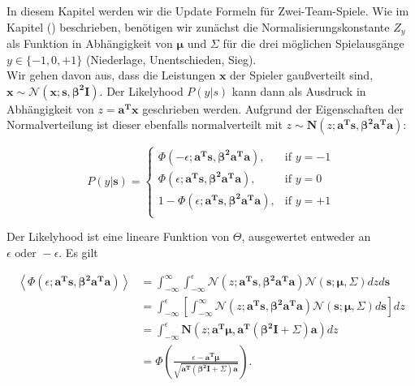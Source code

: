 \documentclass[12pt,a4paper]{scrartcl}
\numberwithin{equation}{section}
\begin{document}
In diesem Kapitel werden wir die Update Formeln für Zwei-Team-Spiele. Wie im Kapitel () beschrieben, benötigen wir
zunächst die Normalisierungskonstante $Z_y$ als Funktion in Abhängigkeit von $\mathbf{\mu} \text{ und } \mathbf{\varSigma}$ für 
die drei möglichen Spielausgänge $y \in \{ -1,0, +1 \}$ (Niederlage, Unentschieden, Sieg). \\
Wir gehen davon aus, dass die Leistungen $\mathbf{x}$ der Spieler gaußverteilt sind, $\mathbf{x} \sim \mathcal{N}(\mathbf{x;s, \beta^2 I})$.
Der Likelyhood $P(y|s)$ kann dann als Ausdruck in Abhängigkeit von $z = \mathbf{a^T x}$ geschrieben werden. Aufgrund der Eigenschaften 
der Normalverteilung ist dieser ebenfalls normalverteilt mit $z \sim \mathbf{N}(z;\mathbf{a^T s, \beta^2 a^T a})$: 

\begin{equation}
 P(y|\mathbf{s}) = \begin{cases}
                     \Phi(- \epsilon; \mathbf{a^Ts, \beta^2 a^T a}), & \mbox{if } y = -1 \\
                     \Phi(\epsilon; \mathbf{a^Ts, \beta^2 a^T a}), & \mbox{if } y = 0 \\
                     1- \Phi(\epsilon; \mathbf{a^Ts, \beta^2 a^T a}), & \mbox{if } y = +1 \\
                   \end{cases}
\end{equation}

Der Likelyhood ist eine lineare Funktion von $\Theta$, ausgewertet entweder an $\epsilon \text{ oder } - \epsilon$. Es gilt

\begin{equation}
\begin{split}
 \left < \Phi \left ( \epsilon; \mathbf{a^T s, \beta^2 a^T a} \right )\right > &= \int_{- \infty}^{\infty} \int_{-\infty}^{\epsilon} \mathcal{N}(z; \mathbf{a^T s , \beta^2 a^T a}) \mathcal{N}(\mathbf{s; \mu, \varSigma})dz d \mathbf{s} \\
 &= \int_{- \infty}^{\epsilon} \left [ \int_{-\infty}^{\infty} \mathcal{N}(z; \mathbf{a^T s , \beta^2 a^T a}) \mathcal{N}(\mathbf{s; \mu, \varSigma}) d \mathbf{s} \right ] dz \\
 &= \int_{- \infty}^{\epsilon} \mathbf{N} \left ( z; \mathbf{a^T \mu, a^T(\beta^2 I + \varSigma) a} \right ) dz \\
 &= \Phi \left( \frac{\epsilon - \mathbf{a^T \mu}}{ \sqrt{\mathbf{a^T(\beta^2 I + \varSigma) a}} } \right).
 \end{split}
 \end{equation}
\end{document}
